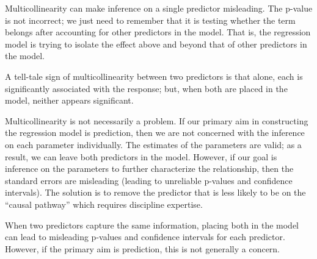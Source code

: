 \documentclass[
  letterpaper,
  DIV=11,
  numbers=noendperiod]{scrreprt}
\theoremstyle{definition}
\theoremstyle{definition}
\theoremstyle{remark}
\begin{document}
Multicollinearity can make inference on a single predictor misleading.
The p-value is not incorrect; we just need to remember that it is
testing whether the term belongs after accounting for other predictors
in the model. That is, the regression model is trying to isolate the
effect above and beyond that of other predictors in the model.

\begin{tcolorbox}[enhanced jigsaw, bottomrule=.15mm, titlerule=0mm, bottomtitle=1mm, colback=white, coltitle=black, rightrule=.15mm, leftrule=.75mm, toprule=.15mm, toptitle=1mm, left=2mm, opacityback=0, colframe=quarto-callout-note-color-frame, breakable, title=\textcolor{quarto-callout-note-color}{\faInfo}\hspace{0.5em}{Note}, arc=.35mm, colbacktitle=quarto-callout-note-color!10!white, opacitybacktitle=0.6]

A tell-tale sign of multicollinearity between two predictors is that
alone, each is significantly associated with the response; but, when
both are placed in the model, neither appears significant.

\end{tcolorbox}

Multicollinearity is not necessarily a problem. If our primary aim in
constructing the regression model is prediction, then we are not
concerned with the inference on each parameter individually. The
estimates of the parameters are valid; as a result, we can leave both
predictors in the model. However, if our goal is inference on the
parameters to further characterize the relationship, then the standard
errors are misleading (leading to unreliable p-values and confidence
intervals). The solution is to remove the predictor that is less likely
to be on the ``causal pathway'' which requires discipline expertise.

\begin{tcolorbox}[enhanced jigsaw, bottomrule=.15mm, titlerule=0mm, bottomtitle=1mm, colback=white, coltitle=black, rightrule=.15mm, leftrule=.75mm, toprule=.15mm, toptitle=1mm, left=2mm, opacityback=0, colframe=quarto-callout-tip-color-frame, breakable, title=\textcolor{quarto-callout-tip-color}{\faLightbulb}\hspace{0.5em}{Big Idea}, arc=.35mm, colbacktitle=quarto-callout-tip-color!10!white, opacitybacktitle=0.6]

When two predictors capture the same information, placing both in the
model can lead to misleading p-values and confidence intervals for each
predictor. However, if the primary aim is prediction, this is not
generally a concern.

\end{tcolorbox}
\end{document}
